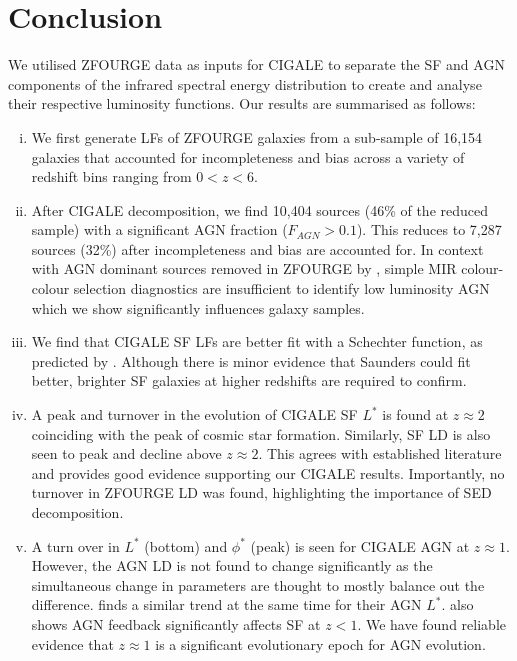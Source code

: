 \section{Conclusion}

We utilised ZFOURGE data as inputs for CIGALE to separate the SF and AGN components of the infrared spectral energy distribution to create and analyse their respective luminosity functions. Our results are summarised as follows:

\begin{enumerate}[(i)]
    \item We first generate LFs of ZFOURGE galaxies from a sub-sample of 16,154 galaxies that accounted for incompleteness and bias across a variety of redshift bins ranging from $0<z<6$.
    
    \item After CIGALE decomposition, we find 10,404 sources (46\% of the reduced sample) with a significant AGN fraction ($F_{AGN} > 0.1$). This reduces to 7,287 sources (32\%) after incompleteness and bias are accounted for. In context with AGN dominant sources removed in ZFOURGE by \cite{cowley_zfourge_2016}, simple MIR colour-colour selection diagnostics are insufficient to identify low luminosity AGN which we show significantly influences galaxy samples.
    
    \item We find that CIGALE SF LFs are better fit with a Schechter function, as predicted by \cite{wu_mid-infrared_2011, fu_decomposing_2010}. Although there is minor evidence that Saunders could fit better, brighter SF galaxies at higher redshifts are required to confirm. 

    \item A peak and turnover in the evolution of CIGALE SF $L^{*}$ is found at $z \approx 2$ coinciding with the peak of cosmic star formation. Similarly, SF LD is also seen to peak and decline above $z\approx2$. This agrees with established literature and provides good evidence supporting our CIGALE results. Importantly, no turnover in ZFOURGE LD was found, highlighting the importance of SED decomposition.
    
    \item A turn over in $L^{*}$ (bottom) and $\phi^{*}$ (peak) is seen for CIGALE AGN at $z \approx 1$. However, the AGN LD is not found to change significantly as the simultaneous change in parameters are thought to mostly balance out the difference. \cite{delvecchio_tracing_2014} finds a similar trend at the same time for their AGN $L^{*}$. \cite{katsianis_evolution_2017} also shows AGN feedback significantly affects SF at $z<1$. We have found reliable evidence that $z\approx1$ is a significant evolutionary epoch for AGN evolution. 
    

\end{enumerate}
